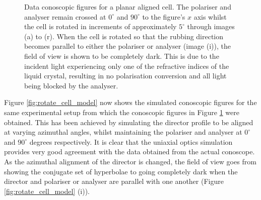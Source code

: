 \begin{figure}
\begin{center}
\end{center}
\caption[Conoscopic images of a planar cell - rotating]{\label{fig:rotate_cell_data}Data conoscopic figures for a planar aligned cell. The polariser and analyser remain crossed at $0^\circ$ and $90^\circ$ to the figure's $x$ axis whilst the cell is rotated in increments of approximately $5^\circ$ through images (a) to (r). When the cell is rotated so that the rubbing direction becomes parallel to either the polariser or analyser (image (i)), the field of view is shown to be  completely dark. This is due to the incident light experiencing only one of the refractive indices of the liquid crystal, resulting in no polarisation conversion and all light being blocked by the analyser.}
\end{figure}

Figure \ref{fig:rotate_cell_model} now shows the simulated conoscopic figures for the same experimental setup from which the conoscopic figures in Figure \ref{fig:rotate_cell_data} were obtained. This has been achieved by simulating the director profile to be aligned at varying azimuthal angles, whilst maintaining the polariser and analyser at $0^\circ$ and $90^\circ$ degrees respectively. It is clear that the uniaxial optics simulation provides very good agreement with the data obtained from the actual conoscope. As the azimuthal alignment of the director is changed, the field of view goes from showing the conjugate set of hyperbolae to going completely dark when the director and polariser or analyser are parallel with one another (Figure \ref{fig:rotate_cell_model} (i)).
 
